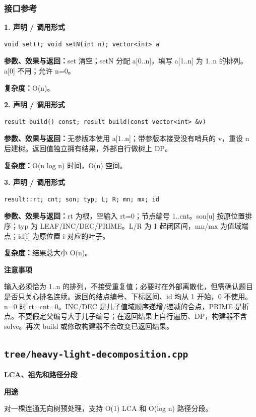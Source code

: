 \documentclass[UTF8,a4paper,10pt]{ctexart}
\newcommand{\TemplUsage}[1]{\textbf{用途}\par #1\par}
\newcommand{\TemplNote}[1]{\textbf{注意事项}\par #1\par}
\begin{document}
\subsubsection*{接口参考}
\noindent\begin{minipage}{\textwidth}
\textbf{1. 声明 / 调用形式}
\begin{lstlisting}
void set(); void setN(int n); vector<int> a
\end{lstlisting}
\textbf{参数、效果与返回：}set 清空；setN 分配 a[0..n]，填写 a[1..n] 为 1..n 的排列。a[0] 不用；允许 n=0。

\textbf{复杂度：}O(n)。

\end{minipage}\par\vspace{0.4em}
\noindent\begin{minipage}{\textwidth}
\textbf{2. 声明 / 调用形式}
\begin{lstlisting}
result build() const; result build(const vector<int> &v)
\end{lstlisting}
\textbf{参数、效果与返回：}无参版本使用 a[1..n]；带参版本接受没有哨兵的 v，重设 n 后建树。返回值独立拥有结果，外部自行做树上 DP。

\textbf{复杂度：}O(n log n) 时间，O(n) 空间。

\end{minipage}\par\vspace{0.4em}
\noindent\begin{minipage}{\textwidth}
\textbf{3. 声明 / 调用形式}
\begin{lstlisting}
result::rt; cnt; son; typ; L; R; mn; mx; id
\end{lstlisting}
\textbf{参数、效果与返回：}rt 为根，空输入 rt=0；节点编号 1..cnt。son[u] 按原位置排序；typ 为 LEAF/INC/DEC/PRIME。L/R 为 1 起闭区间，mn/mx 为值域端点；id[i] 为原位置 i 对应的叶子。

\textbf{复杂度：}结果总大小 O(n)。

\TemplNote{输入必须恰为 1..n 的排列，不接受重复值；必要时在外部离散化，但需确认题目是否只关心排名连续。返回的结点编号、下标区间、id 均从 1 开始，0 不使用。n=0 时 rt=cnt=0。INC/DEC 是儿子值域顺序递增/递减的合点，PRIME 是析点。不要假定父编号大于儿子编号；在返回结果上自行遍历、DP，构建器不含 solve。再次 build 或修改构建器不会改变已返回结果。}
\end{minipage}\par\vspace{0.4em}
\clearpage
\subsection{\texttt{tree/heavy-light-decomposition.cpp}}
\textbf{LCA、祖先和路径分段}\par
\TemplUsage{对一棵连通无向树预处理，支持 O(1) LCA 和 O(log n) 路径分段。}
\end{document}
